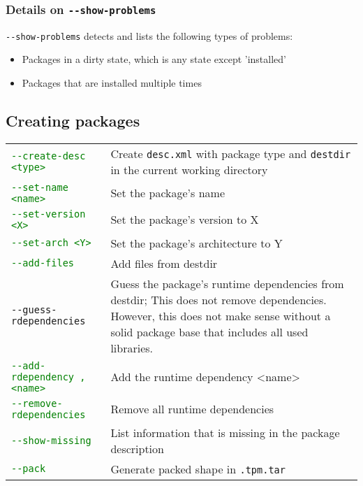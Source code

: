 \documentclass[a4paper]{article}
\newcommand{\file}[1]{\texttt{#1}}
\newcommand{\green}[1]{\textcolor{green}{#1}}
\begin{document}
	\subsubsection{Details on \texttt{-{}-show-problems}}
	
	\texttt{-{}-show-problems} detects and lists the following types of problems:
	
	\noindent
	\begin{itemize}
		\item Packages in a dirty state, which is any state except 'installed'
		\item Packages that are installed multiple times
	\end{itemize}
	
	\subsection{Creating packages}
	\label{sec:creating_packages}
	
	\bgroup
	\def\arraystretch{1.5}
	\begin{tabularx}{\textwidth}{lX}
		\green{\texttt{-{}-create-desc <type>}} & Create \file{desc.xml} with package type and \file{destdir} in the current working directory \\
		
		\green{\texttt{-{}-set-name <name>}} & Set the package's name \\
		
		\green{\texttt{-{}-set-version <X>}} & Set the package's version to X \\
		
		\green{\texttt{-{}-set-arch <Y>}} & Set the package's architecture to Y \\
		
		\green{\texttt{-{}-add-files}} & Add files from destdir \\
		
		\texttt{-{}-guess-rdependencies} & Guess the package's runtime dependencies from destdir; This does not remove dependencies. However, this does not make sense without a solid package base that includes all used libraries. \\
		
		\green{\texttt{-{}-add-rdependency ,<name>}} & Add the runtime dependency <name> \\
		
		\green{\texttt{-{}-remove-rdependencies}} & Remove all runtime dependencies \\
		
		\green{\texttt{-{}-show-missing}} & List information that is missing in the package description \\
		
		\green{\texttt{-{}-pack}} & Generate packed shape in \texttt{.tpm.tar}
	\end{tabularx}
	\egroup
\end{document}
